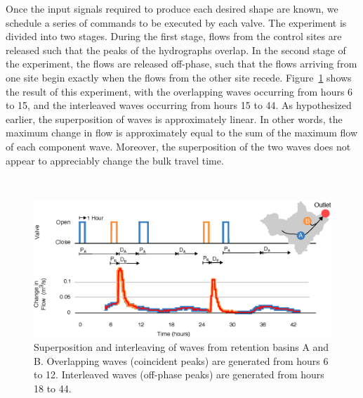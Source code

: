 Once the input signals required to produce each desired shape are known, we schedule a series of commands to be executed by each valve. The experiment is divided into two stages.
During the first stage, flows from the control sites are released such that the peaks of the hydrographs overlap.
In the second stage of the experiment, the flows are released off-phase, such that the flows arriving from one site begin exactly when the flows from the other site recede.
Figure~\ref{fig-ch2:fig6} shows the result of this experiment, with the overlapping waves occurring from hours 6 to 15, and the interleaved waves occurring from hours 15 to 44. As hypothesized earlier, the superposition of waves is approximately linear. In other words, the maximum change in flow is approximately equal to the sum of the maximum flow of each component wave. Moreover, the superposition of the two waves does not appear to appreciably change the bulk travel time.

\

\begin{figure}
    \centering
    \includegraphics[width=\textwidth]{gfx/Chapter-2/Figure6.eps}
    \caption{Superposition and interleaving of waves from retention basins A and B.
    Overlapping waves (coincident peaks) are generated from hours 6 to 12. Interleaved waves (off-phase peaks) are generated from hours 18 to 44.
    }\label{fig-ch2:fig6}
\end{figure}


